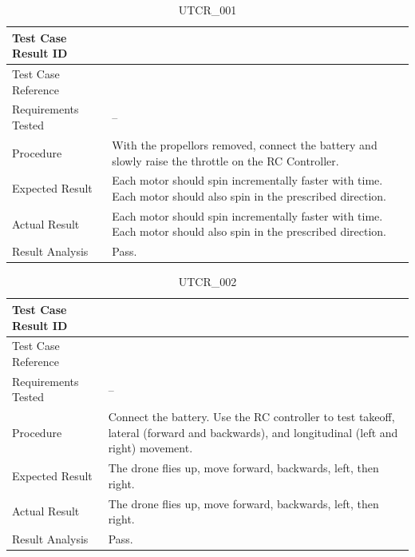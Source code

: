 \documentclass[12pt, titlepage]{article}
\begin{document}
\begin{table}[!h]
\begin{center}
\caption {UTCR\_001}
\label{tab:UTCR_001}
\begin{tabular}{ | m{3.2cm} | m{12.2cm} | } 
\hline
Test Case Result ID & \nameref{tab:UTCR_001} \\ 
\hline
Test Case Reference & \nameref{tab:UTC_001}  \\ 
\hline
Requirements Tested & -- \\ 
\hline
Procedure & With the propellors removed, connect the battery and slowly raise the throttle on the RC Controller. \\ 
\hline
Expected Result & Each motor should spin incrementally faster with time. Each motor should also spin in the prescribed direction. \\ 
\hline
Actual Result & Each motor should spin incrementally faster with time. Each motor should also spin in the prescribed direction.  \\ 
\hline
Result Analysis & Pass. \\ 
\hline
\end{tabular}
\end{center}
\end{table}

\begin{table}[!h]
\begin{center}
\caption {UTCR\_002}
\label{tab:UTCR_002}
\begin{tabular}{ | m{3.2cm} | m{12.2cm} | } 
\hline
Test Case Result ID & \nameref{tab:UTCR_002} \\ 
\hline
Test Case Reference & \nameref{tab:UTC_002}  \\ 
\hline
Requirements Tested & -- \\ 
\hline
Procedure & Connect the battery. Use the RC controller to test takeoff, lateral (forward and backwards), and longitudinal (left and right) movement. \\ 
\hline
Expected Result & The drone flies up, move forward, backwards, left, then right. \\ 
\hline
Actual Result & The drone flies up, move forward, backwards, left, then right. \\ 
\hline
Result Analysis & Pass. \\ 
\hline
\end{tabular}
\end{center}
\end{table}
\end{document}
